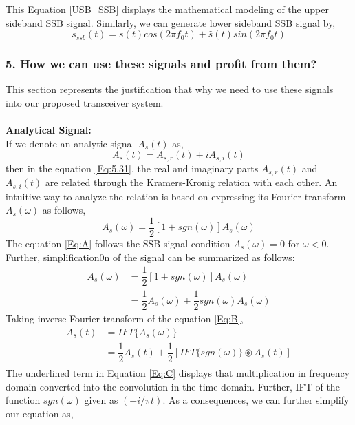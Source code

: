 This Equation \ref{USB_SSB} displays the mathematical modeling of the upper sideband SSB signal. Similarly, we can generate lower sideband SSB signal by,
\begin{equation}
{s}_{ssb}(t)=s(t)cos(2\pi f_0t)+\hat{s}(t)sin(2\pi f_0t)
\label{LSB_SSB}
\end{equation}


\subsubsection{5. How we can use these signals and profit from them?}
This section represents the justification that why we need to use these signals into our proposed transceiver system.\\ \\
\textbf{Analytical Signal:}\\
If we denote an analytic signal $A_s(t)$ as, 
\begin{equation}
A_s(t)=A_{s,r}(t)+iA_{s,i}(t)
\label{Eq:5.31}
\end{equation}
then in the equation \ref{Eq:5.31}, the real and imaginary parts $A_{s,r}(t)$ and $A_{s,i}(t)$ are related through the Kramers-Kronig relation with each other. An intuitive way to analyze the relation is based on expressing its Fourier transform $A_s(\omega)$ as follows,
\begin{equation}
A_s(\omega)=\dfrac{1}{2}[1+sgn(\omega)]A_s(\omega)
\label{Eq:A}
\end{equation}
The equation \ref{Eq:A} follows the SSB signal condition $A_s(\omega)=0$ for $\omega<0$. Further, simplification0n of the signal can be summarized as follows:
\begin{equation}
\begin{split}
A_s(\omega)&=\dfrac{1}{2}[1+sgn(\omega)]A_s(\omega)\\
&=\dfrac{1}{2}A_s(\omega)+\dfrac{1}{2}sgn(\omega)A_s(\omega)
\end{split}
\label{Eq:B}
\end{equation}
Taking inverse Fourier transform of the equation \ref{Eq:B},
\begin{equation}
\begin{split}
{A_s}(t)&=IFT\{A_s(\omega)\}\\
&=\dfrac{1}{2}{A_s}(t)+\underline{\dfrac{1}{2}[IFT\{sgn(\omega)\} \circledast {A_s}(t)]}
\end{split}
\label{Eq:C}
\end{equation}
The underlined term in Equation \ref{Eq:C} displays that multiplication in frequency domain converted into the convolution in the time domain. Further, IFT of the function $sgn(\omega)$ given as $(-i/\pi t)$. As a consequences, we can further simplify our equation as,
